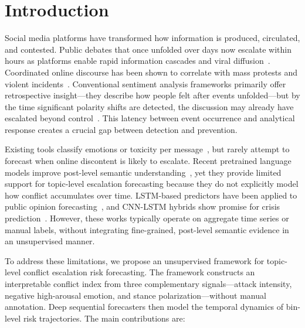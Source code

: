 \documentclass[11pt,a4paper]{article}
\begin{document}
\section{Introduction}

Social media platforms have transformed how information is produced, circulated, and contested. Public debates that once unfolded over days now escalate within hours as platforms enable rapid information cascades and viral diffusion~\cite{Vosoughi2018}. Coordinated online discourse has been shown to correlate with mass protests and violent incidents~\cite{Steinert2015,Arcila2024}. Conventional sentiment analysis frameworks primarily offer retrospective insight---they describe how people felt after events unfolded---but by the time significant polarity shifts are detected, the discussion may already have escalated beyond control~\cite{Wang2020}. This latency between event occurrence and analytical response creates a crucial gap between detection and prevention.

Existing tools classify emotions or toxicity per message~\cite{Wulczyn2017,ghosh2024safespeech}, but rarely attempt to forecast when online discontent is likely to escalate. Recent pretrained language models improve post-level semantic understanding~\cite{birjali2021sentiment,wahid2025crisis}, yet they provide limited support for topic-level escalation forecasting because they do not explicitly model how conflict accumulates over time. LSTM-based predictors have been applied to public opinion forecasting~\cite{Mu2023IPSO,Zhang2024TRESP}, and CNN-LSTM hybrids show promise for crisis prediction~\cite{lou2024cnnlstm,singh2025cupcdlstm,upadhyay2024satcobilstm}. However, these works typically operate on aggregate time series or manual labels, without integrating fine-grained, post-level semantic evidence in an unsupervised manner.

To address these limitations, we propose an unsupervised framework for topic-level conflict escalation risk forecasting. The framework constructs an interpretable conflict index from three complementary signals---attack intensity, negative high-arousal emotion, and stance polarization---without manual annotation. Deep sequential forecasters then model the temporal dynamics of bin-level risk trajectories. The main contributions are:
\end{document}
